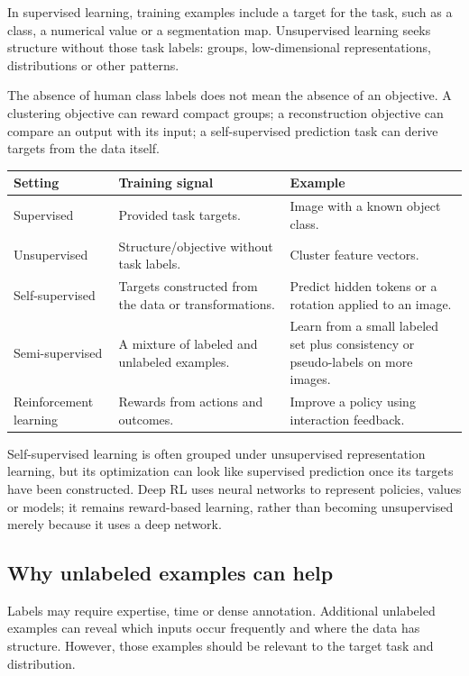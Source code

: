 \documentclass[11pt]{article}
\begin{document}
\tableofcontents\clearpage

In supervised learning, training examples include a target for the task, such as a class, a numerical value or a segmentation map. Unsupervised learning seeks structure without those task labels: groups, low-dimensional representations, distributions or other patterns.

The absence of human class labels does not mean the absence of an objective. A clustering objective can reward compact groups; a reconstruction objective can compare an output with its input; a self-supervised prediction task can derive targets from the data itself.

\begin{longtable}{@{}P{.23\textwidth}P{.35\textwidth}P{.32\textwidth}@{}}
\toprule Setting & Training signal & Example\\\midrule\endhead
Supervised & Provided task targets. & Image with a known object class.\\
Unsupervised & Structure/objective without task labels. & Cluster feature vectors.\\
Self-supervised & Targets constructed from the data or transformations. & Predict hidden tokens or a rotation applied to an image.\\
Semi-supervised & A mixture of labeled and unlabeled examples. & Learn from a small labeled set plus consistency or pseudo-labels on more images.\\
Reinforcement learning & Rewards from actions and outcomes. & Improve a policy using interaction feedback.\\\bottomrule
\end{longtable}
Self-supervised learning is often grouped under unsupervised representation learning, but its optimization can look like supervised prediction once its targets have been constructed. Deep RL uses neural networks to represent policies, values or models; it remains reward-based learning, rather than becoming unsupervised merely because it uses a deep network.

\subsection{Why unlabeled examples can help}
Labels may require expertise, time or dense annotation. Additional unlabeled examples can reveal which inputs occur frequently and where the data has structure. However, those examples should be relevant to the target task and distribution.
\end{document}
